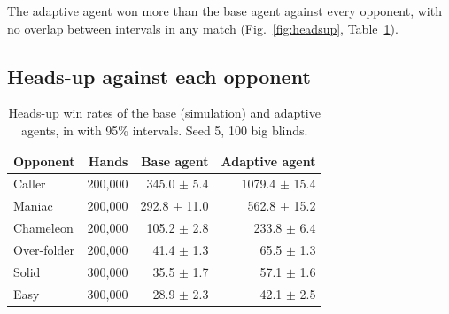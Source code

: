 The adaptive agent won more than the base agent against every opponent, with no overlap
between intervals in any match (Fig.~\ref{fig:headsup}, Table~\ref{tab:headsup}).

\subsection{Heads-up against each opponent}

\begin{table}[t]
\tablefont
\caption{Heads-up win rates of the base (simulation) and adaptive agents, in \bbh{} with 95\%
intervals. Seed 5, 100 big blinds.}
\label{tab:headsup}
\begin{tabular}{@{}lrrr@{}}
\toprule
Opponent & Hands & Base agent & Adaptive agent \\
\midrule
Caller      & 200,000 & 345.0 $\pm$ 5.4  & 1079.4 $\pm$ 15.4 \\
Maniac      & 200,000 & 292.8 $\pm$ 11.0 & 562.8 $\pm$ 15.2 \\
Chameleon   & 200,000 & 105.2 $\pm$ 2.8  & 233.8 $\pm$ 6.4 \\
Over-folder & 200,000 & 41.4 $\pm$ 1.3   & 65.5 $\pm$ 1.3 \\
Solid       & 300,000 & 35.5 $\pm$ 1.7   & 57.1 $\pm$ 1.6 \\
Easy        & 300,000 & 28.9 $\pm$ 2.3   & 42.1 $\pm$ 2.5 \\
\bottomrule
\end{tabular}
\end{table}

